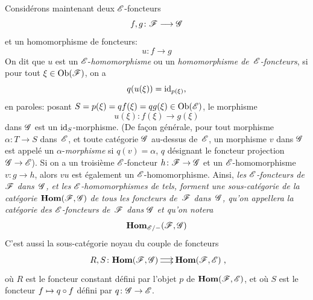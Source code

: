 Consid\'erons maintenant deux $\cal{E}$-foncteurs
$$
f,g\colon \cal{F}\to\cal{G}
$$
et un homomorphisme de foncteurs:
$$
u\colon f\to g
$$
On dit que $u$ est un $\cal{E}$-\emph{homomorphisme} ou un
\og \emph{homomorphisme de~$\cal{E}$-foncteurs}\fg, si pour tout
$\xi\in\Ob(\cal{F})$, on a
$$
q(u(\xi))=\mathrm{id}_{p(\xi)} \text{,}
$$
en paroles: posant
$S=p(\xi)=qf(\xi)=qg(\xi)\in\Ob(\cal{E})$,
le morphisme
$$
u(\xi)\colon f(\xi)\to g(\xi)
$$
dans $\cal{G}$ est un $\mathrm{id}_S$-morphisme. (De fa\c con
g\'en\'erale, pour tout morphisme $\alpha\colon T \to S$
dans~$\cal{E}$, et toute cat\'egorie $\cal{G}$ au-dessus
de~$\cal{E}$, un morphisme $v$ dans $\cal{G}$ est appel\'e un
$\alpha$-\emph{morphisme} si $q(v)=\alpha$, $q$ d\'esignant le
foncteur projection $\cal{G}\to \cal{E}$). Si on a un troisi\`eme
$\cal{E}$-foncteur $h\colon \cal{F}\to \cal{G}$ et un
$\cal{E}$-homomorphisme $v\colon g\to h$, alors $vu$ est \'egalement
un $\cal{E}$-homomorphisme. Ainsi,
\emph{les $\cal{E}$-foncteurs de~$\cal{F}$ dans~$\cal{G}$, et
les $\cal{E}$-homomorphismes de tels, forment une sous-catégorie
de la catégorie $\SheafHom(\cal{F},\cal{G})$ de tous les foncteurs
de~$\cal{F}$ dans~$\cal{G}$, qu'on appellera la catégorie des
$\cal{E}$-foncteurs de~$\cal{F}$ dans $\cal{G}$ et qu'on notera}
$$
\SheafHom_{\cal{E}/-}(\cal{F},\cal{G})
$$
\label{indnot:fi}C'est aussi la sous-cat\'egorie noyau du couple de foncteurs
$$
\xymatrix@C=.5cm{{R,S\colon\mathbf{Hom}(\cal{F},\cal{G})}\ar@<2pt>[r]\ar@<-2pt>[r]&{\mathbf{Hom}(\cal{F},\cal{E})}}\quoi\text{,}
$$
o\`u $R$ est le foncteur constant d\'efini par l'objet $p$ de
$\SheafHom(\cal{F},\cal{E})$, et o\`u $S$ est le foncteur $f\mto
q\circ f$ d\'efini par $q\colon\cal{G}\to\cal{E}$.

